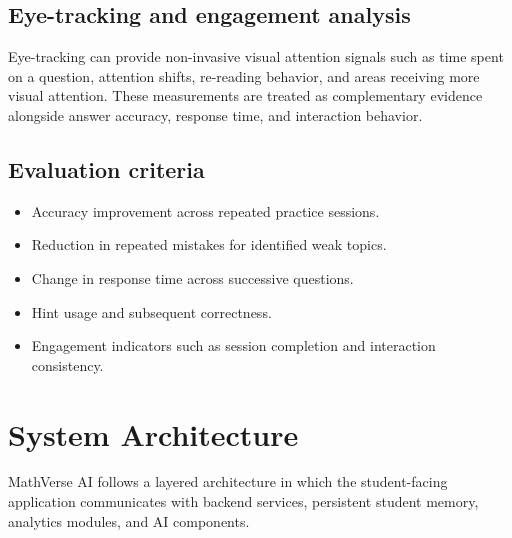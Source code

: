 \documentclass[11pt]{article}
\begin{document}
\subsection{Eye-tracking and engagement analysis}
Eye-tracking can provide non-invasive visual attention signals such as time spent on a question, attention shifts, re-reading behavior, and areas receiving more visual attention. These measurements are treated as complementary evidence alongside answer accuracy, response time, and interaction behavior.

\subsection{Evaluation criteria}
\begin{itemize}
    \item Accuracy improvement across repeated practice sessions.
    \item Reduction in repeated mistakes for identified weak topics.
    \item Change in response time across successive questions.
    \item Hint usage and subsequent correctness.
    \item Engagement indicators such as session completion and interaction consistency.
\end{itemize}

\section{System Architecture}
MathVerse AI follows a layered architecture in which the student-facing application communicates with backend services, persistent student memory, analytics modules, and AI components.
\end{document}
